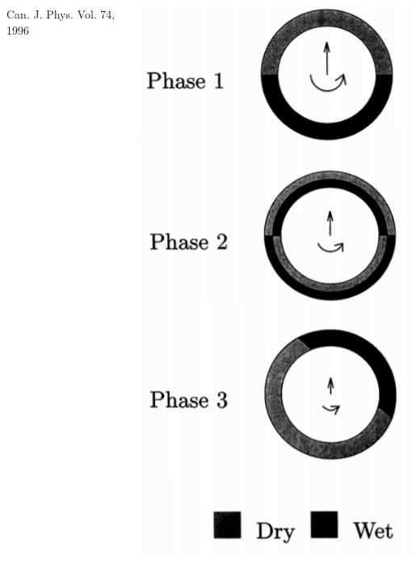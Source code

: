 \documentclass{beamer}
\begin{document}
\begin{frame}
\begin{columns}
\begin{column}{0.6\textwidth}
            \scriptsize{Can. J. Phys. Vol. 74, 1996}
        \end{column}
        \begin{column}{0.35\textwidth}    
            \centering
            \includegraphics[width=1.0\textwidth]{Images/Wet_and_Dry.png}
        \end{column}
    \end{columns}    
\end{frame}
\end{document}
